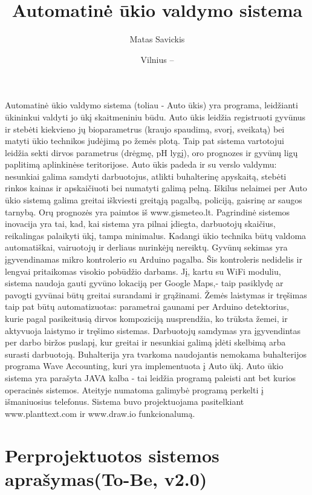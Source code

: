 \documentclass[oneside]{VUMIFPSkursinis}
\title{Automatinė ūkio valdymo sistema}
\author{Matas Savickis}
\date{Vilnius – \the\year}
\begin{document}
\maketitle

\tableofcontents


\centering	
{}
Automatinė ūkio valdymo sistema (toliau - Auto ūkis) yra programa, leidžianti ūkininkui valdyti jo ūkį skaitmeniniu būdu. Auto ūkis leidžia registruoti gyvūnus ir stebėti kiekvieno jų bioparametrus (kraujo spaudimą, svorį, sveikatą) bei matyti ūkio technikos judėjimą po žemės plotą. Taip pat sistema vartotojui leidžia sekti dirvos parametrus (drėgmę, pH lygį), oro prognozes ir gyvūnų ligų paplitimą aplinkinėse teritorijose. Auto ūkis padeda ir su verslo valdymu: nesunkiai galima samdyti darbuotojus, atlikti buhalterinę apyskaitą, stebėti rinkos kainas ir apskaičiuoti bei numatyti galimą pelną. Iškilus nelaimei per Auto ūkio sistemą galima greitai iškviesti greitąją pagalbą, policiją, gaisrinę ar saugos tarnybą. Orų prognozės yra paimtos iš www.gismeteo.lt. Pagrindinė sistemos inovacija yra tai, kad, kai sistema yra pilnai įdiegta, darbuotojų skaičius, reikalingas palaikyti ūkį, tampa minimalus. Kadangi ūkio technika būtų valdoma automatiškai, vairuotojų ir derliaus nurinkėjų nereiktų. Gyvūnų sekimas yra įgyvendinamas mikro kontrolerio su Arduino pagalba. Šis kontroleris nedidelis ir lengvai pritaikomas visokio pobūdžio darbams. Jį, kartu su WiFi moduliu, sistema naudoja gauti gyvūno lokaciją per Google Maps,- taip pasiklydę ar pavogti gyvūnai būtų greitai surandami ir grąžinami. Žemės laistymas ir tręšimas taip pat būtų automatizuotas: parametrai gaunami per Arduino detektorius, kurie pagal pasikeitusią dirvos kompoziciją nusprendžia, ko trūksta žemei, ir aktyvuoja laistymo ir tręšimo sistemas. Darbuotojų samdymas yra įgyvendintas per darbo biržos puslapį, kur greitai ir nesunkiai galimą įdėti skelbimą arba surasti darbuotoją. Buhalterija yra tvarkoma naudojantis nemokama buhalterijos programa Wave Accounting, kuri yra implementuota į Auto ūkį.  Auto ūkio sistema yra parašyta JAVA kalba - tai leidžia programą paleisti ant bet kurios operacinės sistemos. Ateityje numatoma galimybė programą perkelti į išmaniuosius telefonus. Sistema buvo projektuojama pasitelkiant www.planttext.com ir www.draw.io funkcionalumą.

\section{Perprojektuotos sistemos aprašymas(To-Be, v2.0)}
\end{document}
